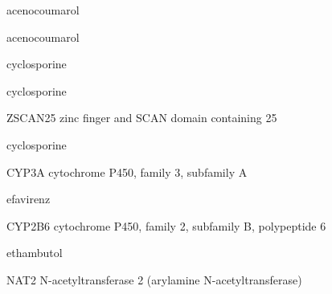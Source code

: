 \documentclass{resume} %
\begin{document}
\begin{rSection}{ acenocoumarol }
\begin{rSection}{ acenocoumarol }
\begin{rSection}{ cyclosporine }
\begin{rSection}{ cyclosporine }
\begin{rSubsection}{ ZSCAN25 }{ zinc finger and SCAN domain containing 25 }{}{}
\end{rSubsection}\begin{rSection}{ cyclosporine }
\item[]
\begin{rSubsection}{ CYP3A }{ cytochrome P450, family 3, subfamily A }{}{}
\item[]


\end{rSubsection}

\end{rSection}\begin{rSection}{ efavirenz }
\item[]
\begin{rSubsection}{ CYP2B6 }{ cytochrome P450, family 2, subfamily B, polypeptide 6 }{}{}
\item[]


\end{rSubsection}

\end{rSection}\begin{rSection}{ ethambutol }
\item[]
\begin{rSubsection}{ NAT2 }{ N-acetyltransferase 2 (arylamine N-acetyltransferase) }{}{}
\item[]


\end{rSubsection}


\end{rSection}
\end{rSection}
\end{rSection}
\end{rSection}
\end{rSection}
\end{document}
